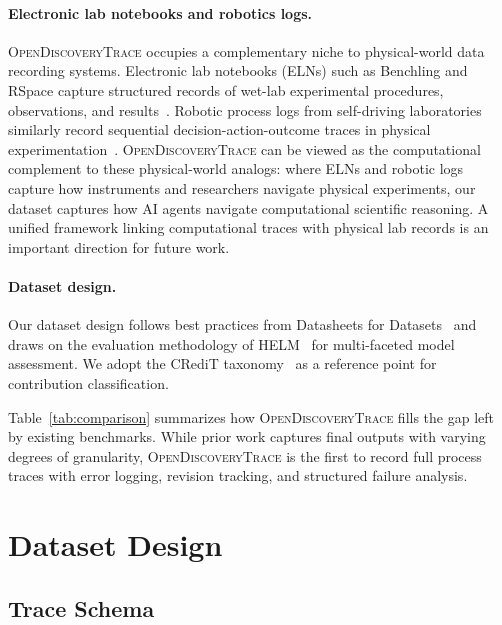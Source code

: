 \documentclass{article}
\newcommand{\dataset}{\textsc{OpenDiscoveryTrace}\xspace}
\begin{document}
\paragraph{Electronic lab notebooks and robotics logs.}
\dataset occupies a complementary niche to physical-world data recording systems. Electronic lab notebooks (ELNs) such as Benchling and RSpace capture structured records of wet-lab experimental procedures, observations, and results~\citep{dirnagl2016eln}. Robotic process logs from self-driving laboratories similarly record sequential decision-action-outcome traces in physical experimentation~\citep{abolhasani2023selfdriving}. \dataset can be viewed as the computational complement to these physical-world analogs: where ELNs and robotic logs capture how instruments and researchers navigate physical experiments, our dataset captures how AI agents navigate computational scientific reasoning. A unified framework linking computational traces with physical lab records is an important direction for future work.

\paragraph{Dataset design.}
Our dataset design follows best practices from Datasheets for Datasets~\citep{gebru2021datasheets} and draws on the evaluation methodology of HELM~\citep{liang2023helm} for multi-faceted model assessment. We adopt the CRediT taxonomy~\citep{brand2015credit} as a reference point for contribution classification.



Table~\ref{tab:comparison} summarizes how \dataset fills the gap left by existing benchmarks. While prior work captures final outputs with varying degrees of granularity, \dataset is the first to record full process traces with error logging, revision tracking, and structured failure analysis.

\section{Dataset Design}
\label{sec:design}

\subsection{Trace Schema}
\label{sec:schema}
\end{document}
